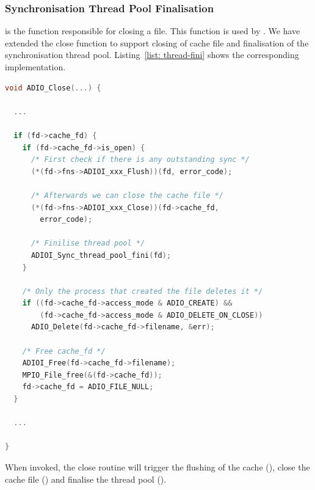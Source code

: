 \subsubsection{Synchronisation Thread Pool Finalisation}
\label{subsubsec: thread-pool-fini}
 is the function responsible for closing a file. This function is used by . We have extended the close function to support closing of cache file and finalisation of the synchronisation thread pool. 
Listing~\ref{list: thread-fini} shows the corresponding implementation.

\begin{lstlisting}[language=C, caption=Synchronisation Thread Pool Finalisation, label={list: thread-fini}]
void ADIO_Close(...) {

  ...

  if (fd->cache_fd) {
    if (fd->cache_fd->is_open) {
      /* First check if there is any outstanding sync */
      (*(fd->fns->ADIOI_xxx_Flush))(fd, error_code);

      /* Afterwards we can close the cache file */
      (*(fd->fns->ADIOI_xxx_Close))(fd->cache_fd, 
        error_code);

      /* Finilise thread pool */
      ADIOI_Sync_thread_pool_fini(fd);
    }

    /* Only the process that created the file deletes it */
    if ((fd->cache_fd->access_mode & ADIO_CREATE) &&
        (fd->cache_fd->access_mode & ADIO_DELETE_ON_CLOSE))
      ADIO_Delete(fd->cache_fd->filename, &err);

    /* Free cache_fd */
    ADIOI_Free(fd->cache_fd->filename);
    MPIO_File_free(&(fd->cache_fd));
    fd->cache_fd = ADIO_FILE_NULL;
  }

  ...

}
\end{lstlisting}

When invoked, the close routine will trigger the flushing of the cache (), close the cache file () and finalise the thread pool ().

